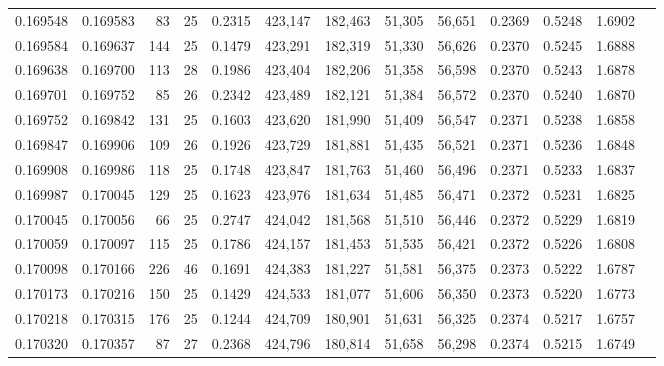 \begin{tabular}{rrrrrrrrrrrrr}
0.169548 & 0.169583 &  83 &  25 &                                     0.2315 & 423,147 & 182,463 &  51,305 &  56,651 & 0.2369 & 0.5248 & 1.6902 \\
0.169584 & 0.169637 & 144 &  25 &                                     0.1479 & 423,291 & 182,319 &  51,330 &  56,626 & 0.2370 & 0.5245 & 1.6888 \\
0.169638 & 0.169700 & 113 &  28 &                                     0.1986 & 423,404 & 182,206 &  51,358 &  56,598 & 0.2370 & 0.5243 & 1.6878 \\
0.169701 & 0.169752 &  85 &  26 &                                     0.2342 & 423,489 & 182,121 &  51,384 &  56,572 & 0.2370 & 0.5240 & 1.6870 \\
0.169752 & 0.169842 & 131 &  25 &                                     0.1603 & 423,620 & 181,990 &  51,409 &  56,547 & 0.2371 & 0.5238 & 1.6858 \\
0.169847 & 0.169906 & 109 &  26 &                                     0.1926 & 423,729 & 181,881 &  51,435 &  56,521 & 0.2371 & 0.5236 & 1.6848 \\
0.169908 & 0.169986 & 118 &  25 &                                     0.1748 & 423,847 & 181,763 &  51,460 &  56,496 & 0.2371 & 0.5233 & 1.6837 \\
0.169987 & 0.170045 & 129 &  25 &                                     0.1623 & 423,976 & 181,634 &  51,485 &  56,471 & 0.2372 & 0.5231 & 1.6825 \\
0.170045 & 0.170056 &  66 &  25 &                                     0.2747 & 424,042 & 181,568 &  51,510 &  56,446 & 0.2372 & 0.5229 & 1.6819 \\
0.170059 & 0.170097 & 115 &  25 &                                     0.1786 & 424,157 & 181,453 &  51,535 &  56,421 & 0.2372 & 0.5226 & 1.6808 \\
0.170098 & 0.170166 & 226 &  46 &                                     0.1691 & 424,383 & 181,227 &  51,581 &  56,375 & 0.2373 & 0.5222 & 1.6787 \\
0.170173 & 0.170216 & 150 &  25 &                                     0.1429 & 424,533 & 181,077 &  51,606 &  56,350 & 0.2373 & 0.5220 & 1.6773 \\
0.170218 & 0.170315 & 176 &  25 &                                     0.1244 & 424,709 & 180,901 &  51,631 &  56,325 & 0.2374 & 0.5217 & 1.6757 \\
0.170320 & 0.170357 &  87 &  27 &                                     0.2368 & 424,796 & 180,814 &  51,658 &  56,298 & 0.2374 & 0.5215 & 1.6749 \\

\end{tabular}
